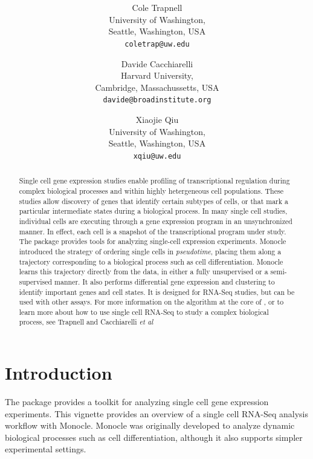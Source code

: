 \documentclass[10pt,oneside]{article}\usepackage[]{graphicx}\usepackage[]{color}
\title{\textsf{\textbf{\thetitle}}}
\author{Cole Trapnell\\[1em]University of Washington,\\ Seattle, Washington, USA\\
\texttt{coletrap@uw.edu} \and
Davide Cacchiarelli\\[1em]Harvard University,\\ Cambridge, Massachussetts, USA\\
\texttt{davide@broadinstitute.org}\and
Xiaojie Qiu\\[1em]University of Washington,\\ Seattle, Washington, USA\\
\texttt{xqiu@uw.edu}
}
\begin{document}
\maketitle

\begin{abstract}
Single cell gene expression studies enable profiling of transcriptional regulation during complex biological processes and within highly hetergeneous cell populations. These studies allow discovery of genes that identify certain subtypes of cells, or that mark a particular intermediate states during a biological process. In many single cell studies, individual cells are executing through a gene expression program in an unsynchronized manner. In effect, each cell is a snapshot of the transcriptional program under study. The package  provides tools for analyzing single-cell expression experiments. Monocle introduced the strategy of ordering single cells in \emph{pseudotime}, placing them along a trajectory corresponding to a biological process such as cell differentiation. Monocle learns this trajectory directly from the data, in either a fully unsupervised or a semi-supervised manner. It also performs differential gene expression and clustering to identify important genes and cell states. It is designed for RNA-Seq studies, but can be used with other assays. For more information on the algorithm at the core of , or to learn more about how to use single cell RNA-Seq to study a complex biological process, see Trapnell and Cacchiarelli \emph{et al}\cite{TRAPNELL_CACCHIARELLI}
\end{abstract}

\tableofcontents



\section{Introduction}

 The  package provides a toolkit for analyzing single cell gene expression experiments. This vignette provides an overview of a single cell RNA-Seq analysis workflow with Monocle. Monocle was originally developed to analyze dynamic biological processes such as cell differentiation, although it also supports simpler experimental settings. 
 
\end{document}
